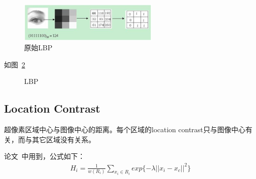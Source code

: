 \documentclass[12pt]{article}
\begin{document}
\begin{figure}[!ht]
\centering
\includegraphics[width=0.6\textwidth]{LBP.png}
\caption{原始LBP}
\label{fig: LBP}
\end{figure} 

如图~\ref{fig: LBP特征}

\begin{figure}
  \centering 
  \caption{LBP}
  \label{fig: LBP特征} %
\end{figure}

\subsection{Location Contrast}

超像素区域中心与图像中心的距离。每个区域的location contrast只与图像中心有关，而与其它区域没有关系。

论文~\cite{yan2013hierarchical}中用到，公式如下：
\begin{align}
H_i = \frac{1}{w(R_i)}\sum_{x_i \in R_i} exp\{-\lambda||x_i-x_c||^2\}
\end{align}
\end{document}

